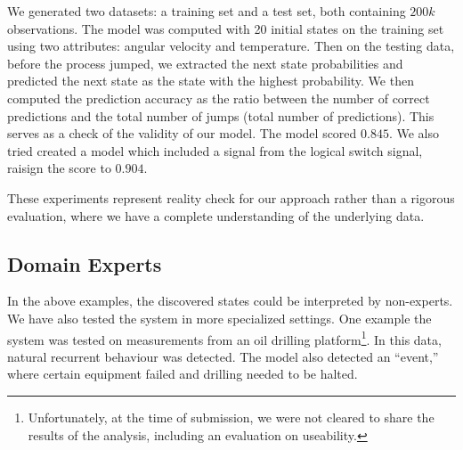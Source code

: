 We generated two datasets: a training set and a test set, both containing $200k$ observations. The model was computed with 20 initial states on the training set using two attributes: angular velocity and temperature. Then on the testing data, before the process jumped, we extracted the next state probabilities and predicted the next state as the state with the highest probability.
We then computed the prediction accuracy as the ratio between the number of correct predictions and the total number
of jumps (total number of predictions). This serves as a check of the validity of our model. The model scored $0.845$. We also tried created a model which included a signal from the logical switch signal, raisign the score to $0.904$.

These experiments represent reality check for our approach rather than a rigorous evaluation, where we have a complete understanding of the underlying data. 



\subsection{Domain Experts}
In the above examples, the discovered states could be interpreted by non-experts. We have also tested the system in more specialized settings. One example the system was tested on measurements from an oil drilling platform\footnote{Unfortunately, at the time of submission, we were not cleared to share the results of the analysis, including an evaluation on useability.}. In this data, natural recurrent behaviour was detected.  The model also detected an ``event,'' where certain equipment failed and drilling needed to be halted.  


